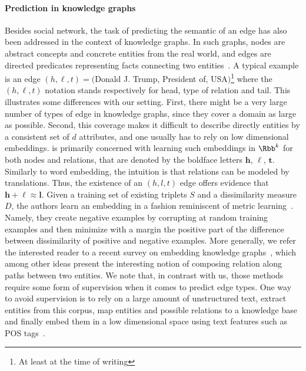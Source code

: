 \paragraph{Prediction in knowledge graphs}
\label{par:erw_pred_kg}

Besides social network, the task of predicting the semantic of an edge has also been addressed in
the context of knowledge graphs. In such graphs, nodes are abstract concepts and concrete entities
from the real world, and edges are directed predicates representing facts connecting two
entities~\autocite{KnowledgeGraphSurvey16}. A typical example is an edge $(h, \ell, t) =
($\textsf{Donald J. Trump}, \textsf{President of}, \textsf{USA}$)$\footnote{At least at the time of
writing} where the $(h, \ell, t)$ notation stands respectively for head, type of relation and tail.
This illustrates some differences with our setting. First, there might be a very large number of
types of edge in knowledge graphs, since they cover a domain as large as possible. Second, this
coverage makes it difficult to describe directly entities by a consistent set of $d$ attributes, and
one usually has to rely on low dimensional embeddings. \autocite{transE13} is primarily concerned
with learning such embeddings in $\Rbb^k$ for both nodes and relations, that are denoted by the
boldface letters $\bm{h}$, $\bm{\ell}$, $\bm{t}$. Similarly to word embedding, the intuition is that
relations can be modeled by translations. Thus, the existence of an $(h,l,t)$ edge offers evidence that
$\bm{h} + \bm{\ell} \approx \bm{l}$. Given a training set of existing triplets $S$ and a
dissimilarity measure $D$, the authors learn an embedding in a fashion reminiscent of metric
learning~\autocite{MetricLearning15}. Namely, they create negative examples by corrupting at random
training examples and then minimize with a margin the positive part of the difference between
dissimilarity of positive and negative examples. More generally, we refer the interested reader to a
recent survey on embedding knowledge graphs~\autocite{KnowledgeGraphSurvey17}, which among other
ideas present the interesting notion of composing relation along paths between two entities. We note
that, in contrast with us, those methods require some form of supervision when it comes to predict
edge types.  One way to avoid supervision is to rely on a large amount of unstructured text, extract
entities from this corpus, map entities and possible relations to a knowledge base and finally embed
them in a low dimensional space using text features such as POS tags~\autocite{Ren2017}.

